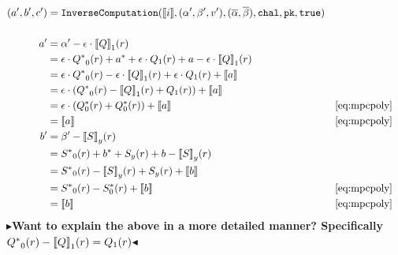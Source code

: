 \documentclass[11pt]{report}
\theoremstyle{definition}
\theoremstyle{plain}
\newcommand{\todo}[1]{{\color[rgb]{.5,0,0}\textbf{$\blacktriangleright$#1$\blacktriangleleft$}}}
\begin{document}
\begin{align*}
  (a', b', c') & = \texttt{InverseComputation}(\sh{i}, (\alpha', \beta', v'),
  (\overline{\alpha}, \overline{\beta}), \texttt{chal}, \texttt{pk}, \texttt{true})                                                     \\\\
  a'           & = \alpha' - \epsilon \cdot {\sh{Q}}_1(r)                                                                               \\
               & = \epsilon \cdot {Q^*}_0(r) + a^* + \epsilon \cdot Q_1(r) + a - \epsilon \cdot {\sh{Q}}_1(r)                           \\
               & = \epsilon \cdot {Q^*}_0(r) - \epsilon \cdot {\sh{Q}}_1(r) + \epsilon \cdot Q_1(r) + \sh{a}                            \\
               & = \epsilon \cdot ({Q^*}_0(r) - {\sh{Q}}_1(r) +  Q_1(r)) + \sh{a}                                                       \\
               & = \epsilon \cdot (Q^*_0(r) +  Q^*_0(r)) + \sh{a}                                             &  & \autoref{eq:mpcpoly} \\
               & = \sh{a}                                                                                     &  & \autoref{eq:mpcpoly} \\
  b'           & = \beta' - {\sh{S}}_y(r)                                                                                               \\
               & = {S^*}_0(r) + b^* + S_y(r) + b - {\sh{S}}_y(r)                                                                        \\
               & = {S^*}_0(r) - {\sh{S}}_y(r) + S_y(r)  + \sh{b}                                                                        \\
               & = {S^*}_0(r) - S^*_0(r)  + \sh{b}                                                            &  & \autoref{eq:mpcpoly} \\
               & = \sh{b}                                                                                     &  & \autoref{eq:mpcpoly} \\
\end{align*}
\todo{Want to explain the above in a more detailed manner? Specifically ${Q^*}_0(r) - {\llbracket Q \rrbracket}_1(r) = Q_1(r)$}
\end{document}
